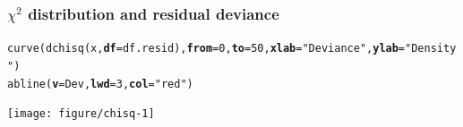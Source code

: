 \documentclass[color=usenames,dvipsnames]{beamer}\usepackage[]{graphicx}\usepackage[]{color}
\makeatletter
\newcommand{\hlnum}[1]{\textcolor[rgb]{0.69,0.494,0}{#1}}%
\newcommand{\hlstr}[1]{\textcolor[rgb]{0.749,0.012,0.012}{#1}}%
\newcommand{\hlstd}[1]{\textcolor[rgb]{0,0,0}{#1}}%
\newcommand{\hlkwc}[1]{\textcolor[rgb]{0,0,0}{\textbf{#1}}}%
\newcommand{\hlkwd}[1]{\textcolor[rgb]{0.004,0.004,0.506}{#1}}%
\newenvironment{kframe}{%
 \def\at@end@of@kframe{}%
 \ifinner\ifhmode%
  \def\at@end@of@kframe{\end{minipage}}%
  \begin{minipage}{\columnwidth}%
 \fi\fi%
 \def\FrameCommand##1{\hskip\@totalleftmargin \hskip-\fboxsep
 \colorbox{shadecolor}{##1}\hskip-\fboxsep
     \hskip-\linewidth \hskip-\@totalleftmargin \hskip\columnwidth}%
 \MakeFramed {\advance\hsize-\width
   \@totalleftmargin\z@ \linewidth\hsize
   \@setminipage}}%
 {\par\unskip\endMakeFramed%
 \at@end@of@kframe}
\newenvironment{knitrout}{}{} %
\makeatother
\begin{document}








\begin{frame}[fragile]
  \frametitle{$\chi^2$ distribution and residual deviance}
\begin{knitrout}\tiny
{}\color{fgcolor}\begin{kframe}
\begin{alltt}
\hlkwd{curve}\hlstd{(}\hlkwd{dchisq}\hlstd{(x,} \hlkwc{df}\hlstd{=df.resid),} \hlkwc{from}\hlstd{=}\hlnum{0}\hlstd{,} \hlkwc{to}\hlstd{=}\hlnum{50}\hlstd{,} \hlkwc{xlab}\hlstd{=}\hlstr{"Deviance"}\hlstd{,} \hlkwc{ylab}\hlstd{=}\hlstr{"Density"}\hlstd{)}
\hlkwd{abline}\hlstd{(}\hlkwc{v}\hlstd{=Dev,} \hlkwc{lwd}\hlstd{=}\hlnum{3}\hlstd{,} \hlkwc{col}\hlstd{=}\hlstr{"red"}\hlstd{)}
\end{alltt}
\end{kframe}
\end{knitrout}
\centering
\texttt{[image: figure/chisq-1]} \\
\end{frame}
\end{document}
